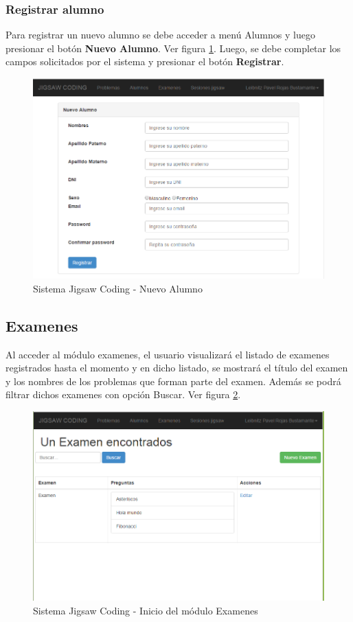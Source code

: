 \subsubsection{Registrar alumno}

Para registrar un nuevo alumno se debe acceder a menú Alumnos y luego presionar el botón \textbf{Nuevo Alumno}. Ver figura \ref{fig:alumnos_nuevo}. Luego, se debe completar los campos solicitados por el sistema y presionar el botón \textbf{Registrar}.

\begin{figure}[h!]
	\centering
	\caption[SJC Nuevo alumno]{Sistema Jigsaw Coding - Nuevo Alumno}
	\label{fig:alumnos_nuevo}
	\includegraphics[scale=0.5]{figuras/usodelsistema/docente/alumnos_nuevo}
\end{figure}

\subsection{Examenes}
Al acceder al módulo examenes, el usuario visualizará el listado de examenes registrados hasta el momento y en dicho listado, se mostrará el título del examen y los nombres de los problemas que forman parte del examen. Además se podrá filtrar dichos examenes con opción Buscar. Ver figura \ref{fig:examenes_inicio}.

\begin{figure}[h!]
	\centering
	\caption[SJC Examenes]{Sistema Jigsaw Coding - Inicio del módulo Examenes}
	\label{fig:examenes_inicio}
	\includegraphics[scale=0.5]{figuras/usodelsistema/docente/examenes_inicio}
\end{figure}
